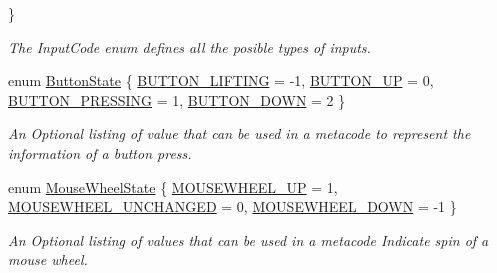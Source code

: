 \begin{DoxyCompactItemize}
 \}
\begin{DoxyCompactList}\small\item\em The InputCode enum defines all the posible types of inputs. \item\end{DoxyCompactList}\item 
enum \hyperlink{classphys_1_1MetaCode_a2fdfb26b3e50ceb0ccc60bfc4c3d6ac2}{ButtonState} \{ \hyperlink{classphys_1_1MetaCode_a2fdfb26b3e50ceb0ccc60bfc4c3d6ac2a6b5564408703517f36debd8c423e2dee}{BUTTON\_\-LIFTING} =  -\/1, 
\hyperlink{classphys_1_1MetaCode_a2fdfb26b3e50ceb0ccc60bfc4c3d6ac2ae275c52779b0f6ec37533af256a70cc3}{BUTTON\_\-UP} =  0, 
\hyperlink{classphys_1_1MetaCode_a2fdfb26b3e50ceb0ccc60bfc4c3d6ac2a33669b2b9ca814664296da55702e412d}{BUTTON\_\-PRESSING} =  1, 
\hyperlink{classphys_1_1MetaCode_a2fdfb26b3e50ceb0ccc60bfc4c3d6ac2a5b52ee1db94dbc2db23f3b4c267b5438}{BUTTON\_\-DOWN} =  2
 \}
\begin{DoxyCompactList}\small\item\em An Optional listing of value that can be used in a metacode to represent the information of a button press. \item\end{DoxyCompactList}\item 
enum \hyperlink{classphys_1_1MetaCode_af9ba277d1ef071be8861e35c2b7d82d6}{MouseWheelState} \{ \hyperlink{classphys_1_1MetaCode_af9ba277d1ef071be8861e35c2b7d82d6a15542262fc8fe9a3d6746f2b84ecde11}{MOUSEWHEEL\_\-UP} =  1, 
\hyperlink{classphys_1_1MetaCode_af9ba277d1ef071be8861e35c2b7d82d6aa3d86fe74d1c191d7c57f886c0b8d99a}{MOUSEWHEEL\_\-UNCHANGED} =  0, 
\hyperlink{classphys_1_1MetaCode_af9ba277d1ef071be8861e35c2b7d82d6ab6edd0886d2ec2d2917bbad96ce3d510}{MOUSEWHEEL\_\-DOWN} =  -\/1
 \}
\begin{DoxyCompactList}\small\item\em An Optional listing of values that can be used in a metacode Indicate spin of a mouse wheel. \item\end{DoxyCompactList}\end{DoxyCompactItemize}
